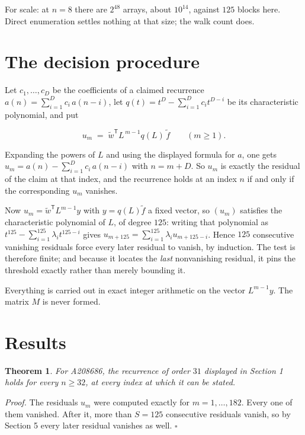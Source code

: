 \documentclass[11pt]{article}
\newtheorem{theorem}{Theorem}
\theoremstyle{definition}
\begin{document}
For scale: at $n = 8$ there are $2^{48}$ arrays, about $10^{14}$, against $125$ blocks here. Direct enumeration settles nothing at that size; the walk count does.

\section{The decision procedure}

Let $c_1,\dots,c_D$ be the coefficients of a claimed recurrence $a(n) = \sum_{i=1}^{D} c_i\,a(n-i)$, let $q(t) = t^{D} - \sum_{i=1}^{D} c_i t^{D-i}$ be its characteristic polynomial, and put

\[u_m \;=\; \tilde w^{\mathsf T} L^{\,m-1} q(L)\,\tilde f \qquad (m \ge 1).\]

Expanding the powers of $L$ and using the displayed formula for $a$, one gets $u_m = a(n) - \sum_{i=1}^{D} c_i\,a(n-i)$ with $n = m + D$. So $u_m$ is exactly the residual of the claim at that index, and the recurrence holds at an index $n$ if and only if the corresponding $u_m$ vanishes.

Now $u_m = \tilde w^{\mathsf T} L^{m-1} y$ with $y = q(L)\tilde f$ a fixed vector, so $(u_m)$ satisfies the characteristic polynomial of $L$, of degree $125$: writing that polynomial as $t^{125} - \sum_{i=1}^{125} \lambda_i t^{125-i}$ gives $u_{m+125} = \sum_{i=1}^{125} \lambda_i u_{m+125-i}$. Hence $125$ consecutive vanishing residuals force every later residual to vanish, by induction. The test is therefore finite; and because it locates the {\itshape last} nonvanishing residual, it pins the threshold exactly rather than merely bounding it.

Everything is carried out in exact integer arithmetic on the vector $L^{m-1}y$. The matrix $M$ is never formed.

\section{Results}

\begin{theorem} For A208686, the recurrence of order $31$ displayed in Section 1 holds for every $n \ge 32$, at every index at which it can be stated.\end{theorem}

{\itshape Proof.} The residuals $u_m$ were computed exactly for $m = 1,\dots,182$. Every one of them vanished. After it, more than $S = 125$ consecutive residuals vanish, so by Section 5 every later residual vanishes as well. $\square$
\end{document}
